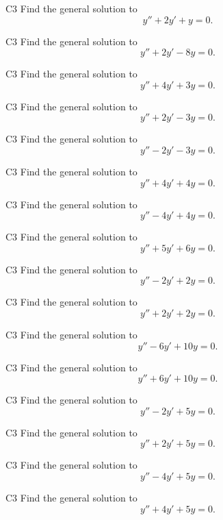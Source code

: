 \begin{problem}{C3}
Find the general solution to
\[
y'' + 2y' + y = 0.
\]
\end{problem}

\begin{problem}{C3}
Find the general solution to
\[
y'' + 2y' - 8y = 0.
\]
\end{problem}

\begin{problem}{C3}
Find the general solution to
\[
y'' + 4y' + 3y = 0.
\]
\end{problem}

\begin{problem}{C3}
Find the general solution to
\[
y'' + 2y' - 3y = 0.
\]
\end{problem}

\begin{problem}{C3}
Find the general solution to
\[
y'' - 2y' - 3y = 0.
\]
\end{problem}

\begin{problem}{C3}
Find the general solution to
\[
y'' + 4y' + 4y = 0.
\]

\end{problem}

\begin{problem}{C3}
Find the general solution to
\[
y'' - 4y' + 4y = 0.
\]
\end{problem}

\begin{problem}{C3}
Find the general solution to
\[
y'' + 5y' + 6y = 0.
\]
\end{problem}


\begin{problem}{C3}
Find the general solution to
\[
y'' - 2y' + 2y = 0.
\]
\end{problem}

\begin{problem}{C3}
Find the general solution to
\[
y'' + 2y' + 2y = 0.
\]
\end{problem}

\begin{problem}{C3}
Find the general solution to
\[
y'' - 6y' + 10y = 0.
\]
\end{problem}

\begin{problem}{C3}
Find the general solution to
\[
y'' + 6y' + 10y = 0.
\]
\end{problem}

\begin{problem}{C3}
Find the general solution to
\[
y'' - 2y' + 5y = 0.
\]
\end{problem}

\begin{problem}{C3}
Find the general solution to
\[
y'' + 2y' + 5y = 0.
\]
\end{problem}

\begin{problem}{C3}
Find the general solution to
\[
y'' - 4y' + 5y = 0.
\]
\end{problem}

\begin{problem}{C3}
Find the general solution to
\[
y'' + 4y' + 5y = 0.
\]
\end{problem}
